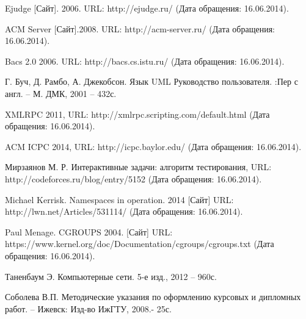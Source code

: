 \begin{thebibliography}{9}

Ejudge [Сайт]. 2006. URL: http://ejudge.ru/ (Дата обращения: 16.06.2014).

ACM Server [Сайт].2008. URL: http://acm-server.ru/ (Дата обращения: 16.06.2014).

Bacs 2.0 2006. URL: http://bacs.cs.istu.ru/ (Дата обращения: 16.06.2014).

Г. Буч, Д. Рамбо, А. Джекобсон. Язык UML Руководство пользователя. :Пер с англ. – М. ДМК, 2001 – 432с.

XMLRPC 2011, URL: http://xmlrpc.scripting.com/default.html (Дата обращения: 16.06.2014).

ACM ICPC 2014, URL: http://icpc.baylor.edu/ (Дата обращения: 16.06.2014).

Мирзаянов М. Р. Интерактивные задачи: алгоритм тестирования, URL: http://codeforces.ru/blog/entry/5152 (Дата обращения: 16.06.2014).

Michael Kerrisk. Namespaces in operation. 2014 [Сайт] URL: http://lwn.net/Articles/531114/ (Дата обращения: 16.06.2014).

Paul Menage. CGROUPS 2004. [Сайт] URL: https://www.kernel.org/doc/Documentation/cgroups/cgroups.txt (Дата обращения: 16.06.2014).

Таненбаум Э. Компьютерные сети. 5-е изд., 2012 -- 960с.

Соболева В.П. Методические указания по оформлению курсовых и дипломных работ. – Ижевск: Изд-во ИжГТУ, 2008.- 25с.

\end{thebibliography}
